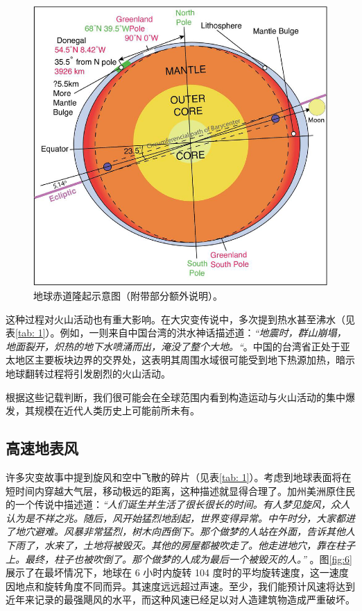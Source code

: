 \documentclass[10pt,twocolumn,letterpaper]{article}
\begin{document}
\begin{figure}[t]
\begin{center}
   \includegraphics[width=1\linewidth]{bulgecrop.png}
\end{center}
   \caption{地球赤道隆起示意图（附带部分额外说明）\cite{16}。}
\label{fig:5}
\label{fig:onecol}
\end{figure}

这种过程对火山活动也有重大影响。在大灾变传说中，多次提到热水甚至沸水（见表\ref{tab: 1}）。例如，一则来自中国台湾的洪水神话描述道：\textit{“地震时，群山崩塌，地面裂开，炽热的地下水喷涌而出，淹没了整个大地。“}\cite{17}。中国的台湾省正处于亚太地区主要板块边界的交界处，这表明其周围水域很可能受到地下热源加热，暗示地球翻转过程将引发剧烈的火山活动。

根据这些记载判断，我们很可能会在全球范围内看到构造运动与火山活动的集中爆发，其规模在近代人类历史上可能前所未有。
\subsection{高速地表风}

许多灾变故事中提到旋风和空中飞散的碎片（见表\ref{tab: 1}）。考虑到地球表面将在短时间内穿越大气层，移动极远的距离，这种描述就显得合理了。加州美洲原住民的一个传说中描述道：\textit{“人们诞生并生活了很长很长的时间。有人梦见旋风，众人认为是不祥之兆。随后，风开始猛烈地刮起，世界变得异常。中午时分，大家都进了地穴避难。风暴非常猛烈，树木向西倒下。那个做梦的人站在外面，告诉其他人下雨了，水来了，土地将被毁灭。其他的房屋都被吹走了。他走进地穴，靠在柱子上。最终，柱子也被吹倒了。那个做梦的人成为最后一个被毁灭的人。”} \cite{17}。图\ref{fig:6}展示了在最坏情况下，地球在 6 小时内旋转 104 度时的平均旋转速度，这一速度因地点和旋转角度不同而异。其速度远远超过声速。至少，我们能预计风速将达到近年来记录的最强飓风的水平，而这种风速已经足以对人造建筑物造成严重破坏。
\end{document}
